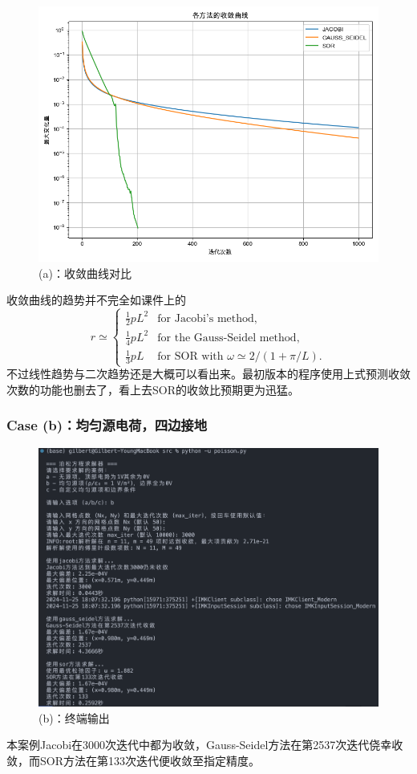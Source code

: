 \begin{figure}[H]
    \centering
    \includegraphics[width=1.0\textwidth]{Problem_1/figs/a_convergence.png}
    \caption{(a)：收敛曲线对比}
\end{figure}
收敛曲线的趋势并不完全如课件上的
\[
    r \simeq
    \begin{cases}
        \frac{1}{2}pL^2 & \text{for Jacobi's method},                       \\
        \frac{1}{4}pL^2 & \text{for the Gauss-Seidel method},               \\
        \frac{1}{3}pL   & \text{for SOR with } \omega \simeq 2/(1 + \pi/L).
    \end{cases}
\]
不过线性趋势与二次趋势还是大概可以看出来。最初版本的程序使用上式预测收敛次数的功能也删去了，看上去SOR的收敛比预期更为迅猛。
\subsubsection{Case (b)：均匀源电荷，四边接地}
\begin{figure}[H]
    \centering
    \includegraphics[width=1.0\textwidth]{Problem_1/figs/b_terminal.png}
    \caption{(b)：终端输出}
\end{figure}
本案例Jacobi在3000次迭代中都为收敛，Gauss-Seidel方法在第2537次迭代侥幸收敛，而SOR方法在第133次迭代便收敛至指定精度。

